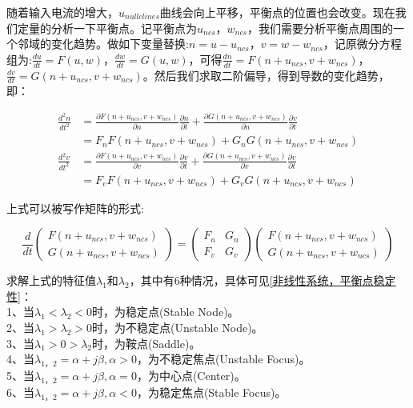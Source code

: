 \documentclass[12pt, a4paper, oneside]{ctexbook}
\begin{document}
随着输入电流的增大，$u_{nullclines}$曲线会向上平移，平衡点的位置也会改变。现在我们定量的分析一下平衡点。记平衡点为$u_{ncs}$，$w_{ncs}$，我们需要分析平衡点周围的一个邻域的变化趋势。做如下变量替换:$n=u-u_{ncs}$，$v=w-w_{ncs}$，记原微分方程组为:$\frac{du}{dt}=F(u,w)$，$\frac{dw}{dt}=G(u,w)$，可得$\frac{dn}{dt}=F(n+u_{ncs},v+w_{ncs})$，$\frac{dv}{dt}=G(n+u_{ncs},v+w_{ncs})$。然后我们求取二阶偏导，得到导数的变化趋势，即：

\begin{equation}
    \begin{aligned}
        \frac{d^2n}{dt^2}&=\frac{\partial F(n+u_{ncs},v+w_{ncs})}{\partial n}\frac{\partial n}{\partial t}+\frac{\partial G(n+u_{ncs},v+w_{ncs})}{\partial n}\frac{\partial v}{\partial t}\\
        &=F_nF(n+u_{ncs},v+w_{ncs})+G_nG(n+u_{ncs},v+w_{ncs})\\
        \frac{d^2v}{dt^2}&=\frac{\partial F(n+u_{ncs},v+w_{ncs})}{\partial v}\frac{\partial v}{\partial t}+\frac{\partial G(n+u_{ncs},v+w_{ncs})}{\partial v}\frac{\partial v}{\partial t}\\
        &=F_vF(n+u_{ncs},v+w_{ncs})+G_vG(n+u_{ncs},v+w_{ncs})
    \end{aligned}
\end{equation}

上式可以被写作矩阵的形式:

\begin{equation}
    \frac{d}{dt}
    \begin{pmatrix}
        F(n+u_{ncs},v+w_{ncs})\\
        G(n+u_{ncs},v+w_{ncs})
    \end{pmatrix}
    =
    \begin{pmatrix}
        F_n & G_n\\
        F_v & G_v
    \end{pmatrix}
    \begin{pmatrix}
        F(n+u_{ncs},v+w_{ncs})\\
        G(n+u_{ncs},v+w_{ncs})
    \end{pmatrix}
\end{equation}

求解上式的特征值$\lambda_1$和$\lambda_2$，其中有6种情况，具体可见\href{https://zhuanlan.zhihu.com/p/141475551}{[非线性系统，平衡点稳定性]}：\\
1、当$\lambda_1<\lambda_2<0$时，为稳定点(Stable Node)。\\
2、当$\lambda_1>\lambda_2>0$时，为不稳定点(Unstable Node)。\\
3、当$\lambda_1>0>\lambda_2$时，为鞍点(Saddle)。\\
4、当$\lambda_{1，2}=\alpha+j\beta,\alpha>0$，为不稳定焦点(Unstable Focus)。\\
5、当$\lambda_{1，2}=\alpha+j\beta,\alpha=0$，为中心点(Center)。\\
6、当$\lambda_{1，2}=\alpha+j\beta,\alpha<0$，为稳定焦点(Stable Focus)。\\
\end{document}
